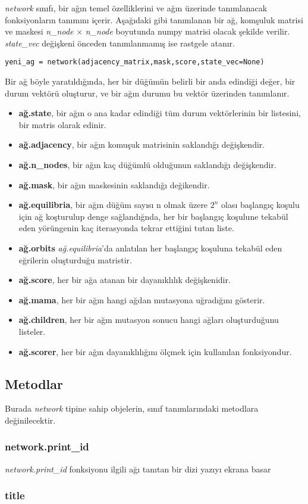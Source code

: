 \documentclass[a4paper,12t]{article}
\begin{document}
\emph{network} sınıfı, bir ağın temel özelliklerini ve ağın üzerinde tanımlanacak fonksiyonların tanımını içerir. Aşağıdaki gibi tanımlanan bir ağ, komşuluk matrisi ve maskesi \emph{n\_node} $\times$ \emph{n\_node} boyutunda numpy matrisi olacak şekilde verilir. \emph{state\_vec} değişkeni önceden tanımlanmamış ise rastgele atanır.

\label{code_network}
\begin{lstlisting}
yeni_ag = network(adjacency_matrix,mask,score,state_vec=None)
\end{lstlisting}

Bir ağ böyle yaratıldığında, her bir düğümün belirli bir anda edindiği değer, bir durum vektörü oluşturur, ve bir ağın durumu bu vektör üzerinden tanımlanır.
\begin{itemize}
\item \textbf{ağ.state}, bir ağın o ana kadar edindiği tüm durum vektörlerinin bir listesini, bir matris olarak edinir.
\item \textbf{ağ.adjacency}, bir ağın komuşuk matrisinin saklandığı değişkendir.
\item \textbf{ağ.n\_nodes}, bir ağın kaç düğümlü olduğunun saklandığı değişkendir. 
\item \textbf{ağ.mask}, bir ağın maskesinin saklandığı değikendir. 
\item \textbf{ağ.equilibria}, bir ağın düğüm sayısı n olmak üzere $2^n$ olası başlangıç koşulu için ağ koşturulup denge sağlandığnda, her bir başlangıç koşulune tekabül eden yörüngenin kaç iterasyonda tekrar ettiğini tutan liste.
\item \textbf{ağ.orbits} \emph{ağ.equilibria}'da anlatılan her başlangıç koşuluna tekabül eden eğrilerin oluşturduğu matristir.
\item \textbf{ağ.score}, her bir ağa atanan bir dayanıklılık değişkenidir. 
\item \textbf{ağ.mama}, her bir ağın hangi ağdan mutasyona uğradığını gösterir.
\item \textbf{ağ.children}, her bir ağın mutasyon sonucu hangi ağları oluşturduğunu listeler.
\item \textbf{ağ.scorer}, her bir ağın dayanıklılığını ölçmek için kullanılan fonksiyondur.
\end{itemize}

\subsection{Metodlar}

Burada \emph{network} tipine sahip objelerin, sınıf tanımlarındaki metodlara değinilecektir.
\subsubsection{network.print\_id}

\emph{network.print\_id} fonksiyonu ilgili ağı tanıtan bir dizi yazıyı ekrana basar

\subsubsection{title}



\end{document}
